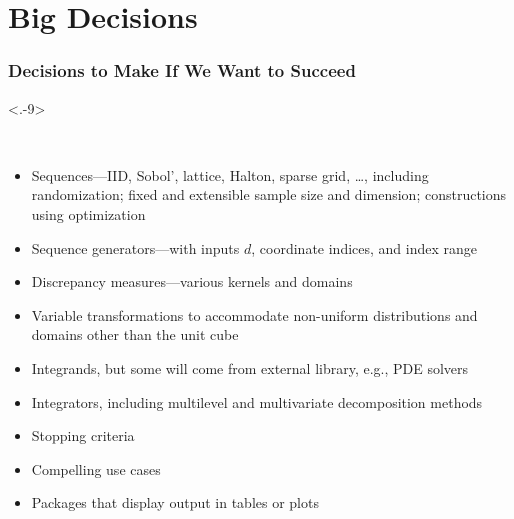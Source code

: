 \documentclass[11pt,compress,xcolor={usenames,dvipsnames},aspectratio=169]{beamer}
\begin{document}
\section{Big Decisions}

\begin{frame}
\frametitle{Decisions to Make If We Want to Succeed}

\vspace{-7ex}

\begin{description}
\only<.-9>{\item[Key Elements] \
\begin{itemize}[<+-| alert@+>]
\item Sequences---IID, Sobol', lattice, Halton, sparse grid,  \ldots, including randomization; fixed and extensible sample size and dimension; constructions using optimization

\item Sequence generators---with inputs $d$, coordinate indices, and index range

\item Discrepancy measures---various kernels and domains

\item Variable transformations to accommodate non-uniform distributions and  domains other than the unit cube

\item Integrands, but some will come from external library, e.g., PDE solvers

\item Integrators, including multilevel and multivariate decomposition methods

\item Stopping criteria

\item Compelling use cases

\item Packages that display output in tables or plots
\end{itemize}}

\end{description}
\end{frame}
\end{document}
